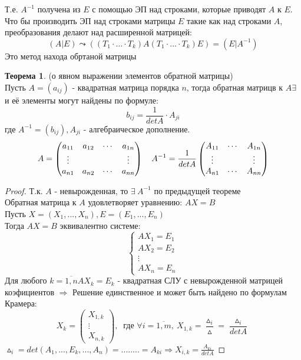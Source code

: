 \documentclass[a4paper, 12pt]{article}
\theoremstyle{definition}
\newtheorem*{theorem}{Теорема}
\begin{document}
  Т.е. $A^{-1}$ получена из $E$ с помощью ЭП над строками, которые приводят $A$ к $E$. \\
  Что бы производить ЭП над строками матрицы $E$ такие как над строками $A$, преобразования делают над расширенной матрицей:
  $$(A|E) \leadsto ((T_1 \cdot ... \cdot T_k)A(T_1 \cdot ... \cdot T_k)E) = (E|A^{-1})$$ 
  Это метод находа обртаной матрицы
  \begin{theorem}
    (о явном выражении элементов обратной матрицы) \\
    Пусть $A = (a_{ij})$ - квадратная матрица порядка $n$, тогда обратная матрицв к $A \exists \ $ и её элементы могут найдены по формуле: 
    $$b_{ij} = \frac{1}{detA} \cdot A_{ji}$$
    где $A^{-1} = (b_{ij}), A_{ji}$ - алгебраическое дополнение. 
    $$A = \begin{pmatrix}
      a_{11} & a_{12} & \cdots & a_{1n} \\
      \vdots & \null & \null & \vdots \\
      a_{n1} & a_{n2} & \cdots & a_{nn} 
    \end{pmatrix} \ \ \ A^{-1} = \frac{1}{detA} \begin{pmatrix}
      A_{11} & \cdots & A_{1n} \\
      \vdots  & \null & \vdots \\
      A_{n1} &  \cdots & A_{nn} 
    \end{pmatrix}$$    
  \end{theorem} 
  \begin{proof}
    Т.к. $A$ - невырожденная, то $\exists \ A^{-1}$ по предыдущей теореме \\
    Обратная матрица к $A$ удовлетворяет уравнению: $AX=B$ \\
    Пусть $X = (X_1,...,X_n), E = (E_1,...,E_n)$ \\
    Тогда $AX = B$ эквивалентно системе:
    $$\begin{cases}
      AX_1 = E_1 \\
      AX_2 = E_2 \\
      \vdots \\
      AX_n = E_n
    \end{cases}$$    
    Для любого $k = \overline{1,n} AX_k = E_k $ - квадратная СЛУ с невырожденной матрицей коэфициентов $\Longrightarrow $ Решение единственное и может быть найдено по формулам Крамера:
    $$X_k = \begin{pmatrix}
    X_{1,k} \\ \vdots \\ X_{n,k} \end{pmatrix}, \  \text{ где } \forall i = \overline{1,m}, \ X_{1,k} = \frac{\vartriangle_i}{\vartriangle} = \frac{\vartriangle_i}{detA}$$
    $\vartriangle_i = det(A_1,...,E_k,...,A_n) = ........ = A_{ki} \Longrightarrow X_{i,k} = \frac{A_{ki}}{detA}$ 
  \end{proof} 
\end{document}
